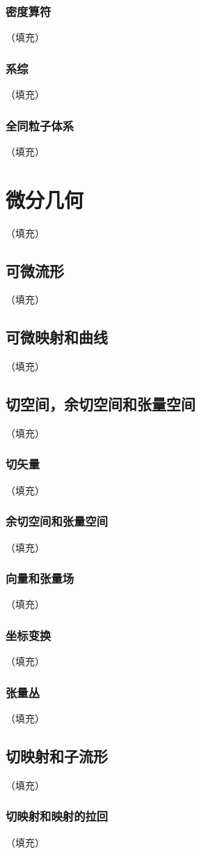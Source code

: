 \documentclass[hyperref,UTF8]{ctexbook}
\begin{document}
\subsection{密度算符}（填充）
\subsection{系综}（填充）
\subsection{全同粒子体系}（填充）
\chapter{微分几何}（填充）
\section{可微流形}（填充）
\section{可微映射和曲线}（填充）
\section{切空间，余切空间和张量空间}（填充）
\subsection{切矢量}（填充）
\subsection{余切空间和张量空间}（填充）
\subsection{向量和张量场}（填充）
\subsection{坐标变换}（填充）
\subsection{张量丛}（填充）
\section{切映射和子流形}（填充）
\subsection{切映射和映射的拉回}（填充）
\end{document}
